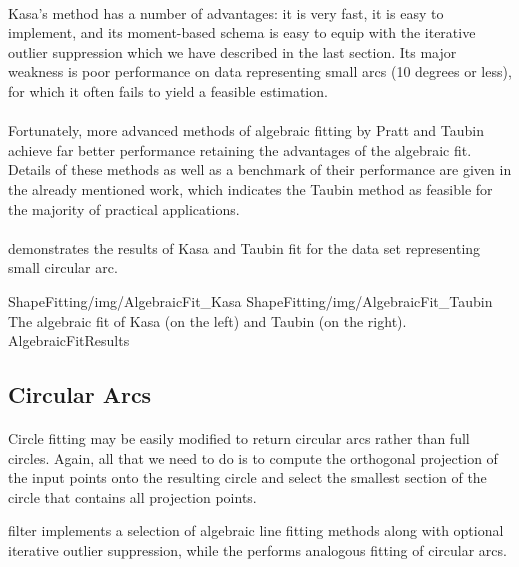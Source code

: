 \paragraph*{}
Kasa's method has a number of advantages: it is very fast, it is easy to implement, and its moment-based schema is easy to equip with the iterative outlier suppression which we have described in the last section. Its major weakness is poor performance on data representing small arcs (10 degrees or less), for which it often fails to yield a feasible estimation.

\paragraph*{}
Fortunately, more advanced methods of algebraic fitting by Pratt and Taubin achieve far better performance retaining the advantages of the algebraic fit. Details of these methods as well as a benchmark of their performance are given in the already mentioned work\cite{Chernov10}, which indicates the Taubin method as feasible for the majority of practical applications.  

\paragraph*{}
 demonstrates the results of Kasa and Taubin fit for the data set representing small circular arc.

\twoFigures
{ShapeFitting/img/AlgebraicFit_Kasa}
{ShapeFitting/img/AlgebraicFit_Taubin}
{The algebraic fit of Kasa (on the left) and Taubin (on the right).}
{AlgebraicFitResults}
{\basicWidth}

\subsection{Circular Arcs}

\paragraph*{}
Circle fitting may be easily modified to return circular arcs rather than full circles. Again, all that we need to do is to compute the orthogonal projection of the input points onto the resulting circle and select the smallest section of the circle that contains all projection points.

\begin{refImpl}
\studio filter  implements a selection of algebraic line fitting methods along with optional iterative outlier suppression, while the  performs analogous fitting of circular arcs.
\end{refImpl}